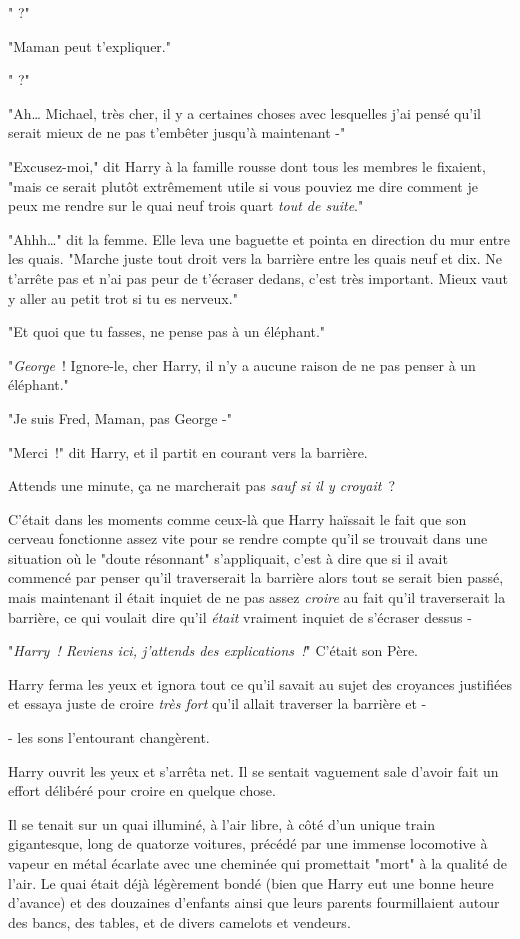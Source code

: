" ?"

"Maman peut t'expliquer."

" ?"

"Ah… Michael, très cher, il y a certaines choses avec lesquelles j'ai pensé qu'il serait mieux de ne pas t'embêter jusqu'à maintenant -"

"Excusez-moi," dit Harry à la famille rousse dont tous les membres le fixaient, "mais ce serait plutôt extrêmement utile si vous pouviez me dire comment je peux me rendre sur le quai neuf trois quart \emph{tout de suite}."

"Ahhh…" dit la femme. Elle leva une baguette et pointa en direction du mur entre les quais. "Marche juste tout droit vers la barrière entre les quais neuf et dix. Ne t'arrête pas et n'ai pas peur de t'écraser dedans, c'est très important. Mieux vaut y aller au petit trot si tu es nerveux."

"Et quoi que tu fasses, ne pense pas à un éléphant."

"\emph{George}~! Ignore-le, cher Harry, il n'y a aucune raison de ne pas penser à un éléphant."

"Je suis Fred, Maman, pas George -"

"Merci~!" dit Harry, et il partit en courant vers la barrière.

Attends une minute, ça ne marcherait pas \emph{sauf si il y croyait}~?

C'était dans les moments comme ceux-là que Harry haïssait le fait que son cerveau fonctionne assez vite pour se rendre compte qu'il se trouvait dans une situation où le "doute résonnant" s'appliquait, c'est à dire que si il avait commencé par penser qu'il traverserait la barrière alors tout se serait bien passé, mais maintenant il était inquiet de ne pas assez \emph{croire} au fait qu'il traverserait la barrière, ce qui voulait dire qu'il \emph{était} vraiment inquiet de s'écraser dessus -

"\emph{Harry~! Reviens ici, j'attends des explications~!}" C'était son Père.

Harry ferma les yeux et ignora tout ce qu'il savait au sujet des croyances justifiées et essaya juste de croire \emph{très fort} qu'il allait traverser la barrière et -

- les sons l'entourant changèrent.

Harry ouvrit les yeux et s'arrêta net. Il se sentait vaguement sale d'avoir fait un effort délibéré pour croire en quelque chose.

Il se tenait sur un quai illuminé, à l'air libre, à côté d'un unique train gigantesque, long de quatorze voitures, précédé par une immense locomotive à vapeur en métal écarlate avec une cheminée qui promettait "mort" à la qualité de l'air. Le quai était déjà légèrement bondé (bien que Harry eut une bonne heure d'avance) et des douzaines d'enfants ainsi que leurs parents fourmillaient autour des bancs, des tables, et de divers camelots et vendeurs.

